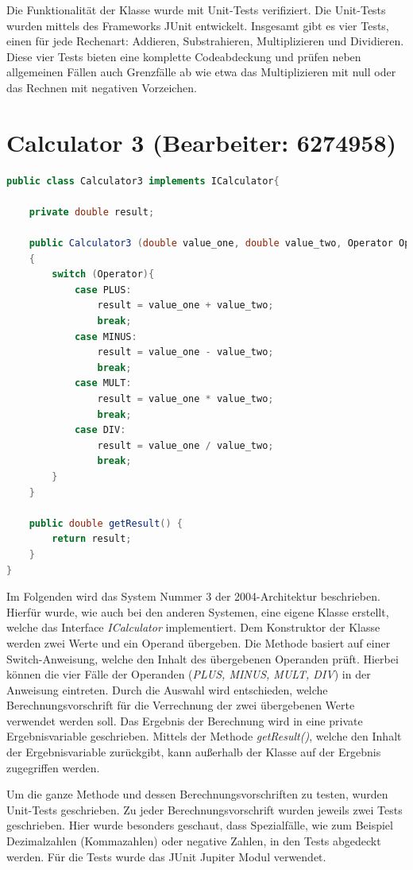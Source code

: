 Die Funktionalität der Klasse wurde mit Unit-Tests verifiziert. Die Unit-Tests wurden mittels des Frameworks JUnit entwickelt.
Insgesamt gibt es vier Tests, einen für jede Rechenart:
Addieren, Substrahieren, Multiplizieren und Dividieren. Diese vier Tests bieten eine komplette Codeabdeckung und prüfen neben allgemeinen Fällen auch Grenzfälle ab wie etwa das Multiplizieren mit null oder das Rechnen mit negativen Vorzeichen.


\chapter{Calculator 3 (Bearbeiter: 6274958)}

\begin{lstlisting}[language=Java,basicstyle=\scriptsize, caption= Calculator 3]
public class Calculator3 implements ICalculator{

    private double result;

    public Calculator3 (double value_one, double value_two, Operator Operator)
    {
        switch (Operator){
            case PLUS:
                result = value_one + value_two;
                break;
            case MINUS:
                result = value_one - value_two;
                break;
            case MULT:
                result = value_one * value_two;
                break;
            case DIV:
                result = value_one / value_two;
                break;
        }
    }

    public double getResult() {
        return result;
    }
}
\end{lstlisting}

Im Folgenden wird das System Nummer 3 der 2004-Architektur beschrieben. Hierfür wurde, wie auch bei den anderen Systemen, eine eigene Klasse erstellt, welche das Interface \textit{ICalculator} implementiert. Dem Konstruktor der Klasse werden zwei Werte und ein Operand übergeben. Die Methode basiert auf einer Switch-Anweisung, welche den Inhalt des übergebenen Operanden prüft. Hierbei können die vier Fälle der Operanden (\textit{PLUS, MINUS, MULT, DIV}) in der Anweisung eintreten. Durch die Auswahl wird entschieden, welche Berechnungsvorschrift für die Verrechnung der zwei übergebenen Werte verwendet werden soll.  Das Ergebnis der Berechnung wird in eine private Ergebnisvariable geschrieben. Mittels der Methode \textit{getResult()}, welche den Inhalt der Ergebnisvariable zurückgibt, kann außerhalb der Klasse auf der Ergebnis zugegriffen werden. 


Um die ganze Methode und dessen Berechnungsvorschriften zu testen, wurden Unit-Tests geschrieben. Zu jeder Berechnungsvorschrift wurden jeweils zwei Tests geschrieben. Hier wurde besonders geschaut, dass Spezialfälle, wie zum Beispiel Dezimalzahlen (Kommazahlen) oder negative Zahlen, in den Tests abgedeckt werden. Für die Tests wurde das JUnit Jupiter Modul verwendet.


